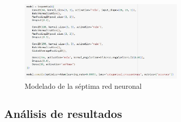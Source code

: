 \begin{figure}[H]
	\centering
	\includegraphics[width=0.7\textwidth]{imgs/model-red7.JPG}
	\caption{Modelado de la séptima red neuronal}
	\label{fig:model-red7}
\end{figure}



\subsection{Análisis de resultados}

